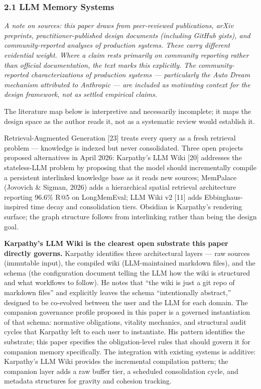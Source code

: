 \documentclass[
  11pt,
]{article}
\begin{document}
\hypertarget{llm-memory-systems}{%
\subsubsection{2.1 LLM Memory Systems}\label{llm-memory-systems}}

\emph{A note on sources: this paper draws from peer-reviewed
publications, arXiv preprints, practitioner-published design documents
(including GitHub gists), and community-reported analyses of production
systems. These carry different evidential weight. Where a claim rests
primarily on community reporting rather than official documentation, the
text marks this explicitly. The community-reported characterizations of
production systems --- particularly the Auto Dream mechanism attributed
to Anthropic --- are included as motivating context for the design
framework, not as settled empirical claims.}

The literature map below is interpretive and necessarily incomplete; it
maps the design space as the author reads it, not as a systematic review
would establish it.

Retrieval-Augmented Generation {[}23{]} treats every query as a fresh
retrieval problem --- knowledge is indexed but never consolidated. Three
open projects proposed alternatives in April 2026: Karpathy's LLM Wiki
{[}20{]} addresses the stateless-LLM problem by proposing that the model
should incrementally compile a persistent interlinked knowledge base as
it reads new sources; MemPalace (Jovovich \& Sigman, 2026) adds a
hierarchical spatial retrieval architecture reporting 96.6\% R@5 on
LongMemEval; LLM Wiki v2 {[}11{]} adds Ebbinghaus-inspired time decay
and consolidation tiers. Obsidian is Karpathy's rendering surface; the
graph structure follows from interlinking rather than being the design
goal.

\textbf{Karpathy's LLM Wiki is the clearest open substrate this paper
directly governs.} Karpathy identifies three architectural layers ---
raw sources (immutable input), the compiled wiki (LLM-maintained
markdown files), and the schema (the configuration document telling the
LLM how the wiki is structured and what workflows to follow). He notes
that ``the wiki is just a git repo of markdown files'' and explicitly
leaves the schema ``intentionally abstract,'' designed to be co-evolved
between the user and the LLM for each domain. The companion governance
profile proposed in this paper is a governed instantiation of that
schema: normative obligations, vitality mechanics, and structural audit
cycles that Karpathy left to each user to instantiate. His pattern
identifies the substrate; this paper specifies the obligation-level
rules that should govern it for companion memory specifically. The
integration with existing systems is additive: Karpathy's LLM Wiki
provides the incremental compilation pattern; the companion layer adds a
raw buffer tier, a scheduled consolidation cycle, and metadata
structures for gravity and cohesion tracking.
\end{document}
